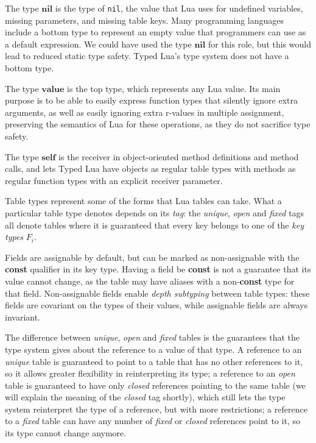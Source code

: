 \documentclass[10pt]{sigplanconf}
\newcommand{\Value}{\mathbf{value}}
\newcommand{\Nil}{\mathbf{nil}}
\newcommand{\Self}{\mathbf{self}}
\begin{document}
The type $\Nil$ is the type of {\tt nil}, the value that Lua uses for undefined variables, missing parameters, and missing table keys.
Many programming languages include a bottom type to represent
an empty value that programmers can use as a default expression.
We could have used the type $\Nil$ for this role, but
this would lead to reduced static type safety. Typed Lua's
type system does not have a bottom type.

The type $\Value$ is the top type, which represents any Lua value.
Its main purpose is to be able to easily express function types
that silently ignore extra arguments, as well as easily ignoring extra r-values in multiple assignment, preserving the semantics of Lua for these operations, as they do not sacrifice type safety.

The type $\Self$ is the receiver in object-oriented method
definitions and method calls, and lets Typed Lua have objects
as regular table types with methods as regular function types
with an explicit receiver parameter.

Table types represent some of the forms that Lua
tables can take. What a particular table type denotes
depends on its {\em tag}: the {\em unique}, {\em open}
and {\em fixed} tags all denote tables where it is
guaranteed that every key belongs to one of the {\em key
types} $F_i$. 


Fields are assignable by default, but can be marked
as non-assignable with the {\bf const} qualifier in its key type.
Having a field be {\bf const} is not a guarantee that its
value cannot change, as the table may have aliases with
a non-{\bf const} type for that field. Non-assignable
fields enable {\em depth subtyping} between table types: these
fields are covariant on the types of their values, while
assignable fields are always invariant.

The difference between {\em unique}, {\em open} and
{\em fixed} tables is the guarantees that the type system
gives about the reference to a value of that type. A
reference to an {\em unique} table is guaranteed to
point to a table that has no other references to it,
so it allows greater flexibility in reinterpreting its type;
a reference to an {\em open} table is guaranteed to have
only {\em closed} references pointing to the
same table (we will explain the meaning of the {\em closed} tag shortly), which still lets the type system
reinterpret the type of a reference, but with more
restrictions; a reference to a {\em fixed} table can have any number of
{\em fixed} or {\em closed} references point to it, 
so its type cannot change
anymore.
\end{document}
